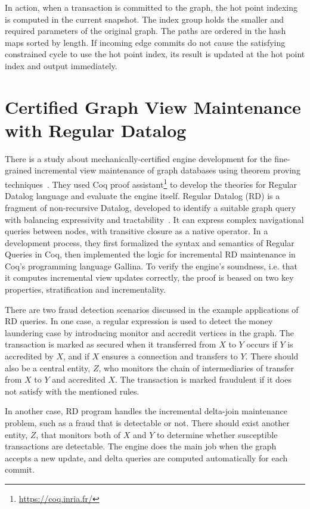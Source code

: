 In action, when a transaction is committed to the graph, the hot point indexing is computed in the current snapshot.
The index group holds the smaller and required parameters of the original graph.
The paths are ordered in the hash maps sorted by length.
If incoming edge commits do not cause the satisfying constrained cycle to use the hot point index, its result is updated at the hot point index and output immediately. 

\section{Certified Graph View Maintenance with Regular Datalog}

There is a study about mechanically-certified engine development for the fine-grained incremental view maintenance of graph databases using theorem proving techniques~\cite{DBLP:journals/tplp/BonifatiDA18}.
They used Coq proof assistant\footnote{\url{https://coq.inria.fr/}} to develop the theories for Regular Datalog language and evaluate the engine itself.
Regular Datalog (RD) is a fragment of non-recursive Datalog, developed to identify a suitable graph query with balancing expressivity and tractability~\cite{DBLP:journals/mst/ReutterRV17}.
It can express complex navigational queries between nodes, with transitive closure as a native operator.
In a development process, they first formalized the syntax and semantics of Regular Queries in Coq, then implemented the logic for incremental RD maintenance in Coq's programming language Gallina.
To verify the engine's soundness, i.e. that it computes incremental view updates correctly, the proof is beased on two key properties, stratification and incrementality.

There are two fraud detection scenarios discussed in the example applications of RD queries.
In one case, a regular expression is used to detect the money laundering case by introducing monitor and accredit vertices in the graph.
The transaction is marked as secured when it transferred from $X$ to $Y$ occurs if $Y$ is accredited by $X$, and if $X$ ensures a connection and transfers to $Y$.
There should also be a central entity, $Z$, who monitors the chain of intermediaries of transfer from $X$ to $Y$ and accredited $X$.
The transaction is marked fraudulent if it does not satisfy with the mentioned rules.

In another case, RD program handles the incremental delta-join maintenance problem, such as a fraud that is detectable or not.
There should exist another entity, $Z$, that monitors both of $X$ and $Y$ to determine whether susceptible transactions are detectable.
The engine does the main job when the graph accepts a new update, and delta queries are computed automatically for each commit.
